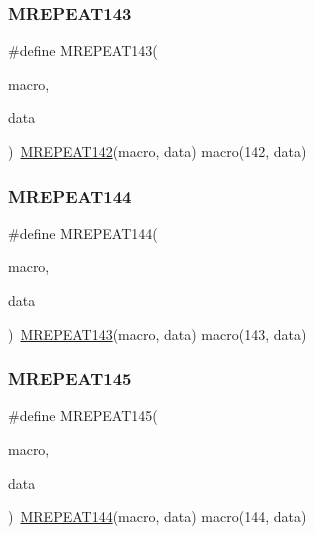\mbox{\label{group__group__sam0__utils__mrepeat_ga6f4bd791a6e9e20406ebf8a1ba70d3e7}} 
\subsubsection{\texorpdfstring{MREPEAT143}{MREPEAT143}}
{\footnotesize\ttfamily \#define M\+R\+E\+P\+E\+A\+T143(\begin{DoxyParamCaption}\item[{}]{macro,  }\item[{}]{data }\end{DoxyParamCaption})~\mbox{\hyperlink{group__group__sam0__utils__mrepeat_ga6177414b6882cdd46b50b679a3cfb927}{M\+R\+E\+P\+E\+A\+T142}}(macro, data)   macro(142, data)}

\mbox{\label{group__group__sam0__utils__mrepeat_ga02a2c148781cd12ab2a14368078ed3ed}} 
\subsubsection{\texorpdfstring{MREPEAT144}{MREPEAT144}}
{\footnotesize\ttfamily \#define M\+R\+E\+P\+E\+A\+T144(\begin{DoxyParamCaption}\item[{}]{macro,  }\item[{}]{data }\end{DoxyParamCaption})~\mbox{\hyperlink{group__group__sam0__utils__mrepeat_ga6f4bd791a6e9e20406ebf8a1ba70d3e7}{M\+R\+E\+P\+E\+A\+T143}}(macro, data)   macro(143, data)}

\mbox{\label{group__group__sam0__utils__mrepeat_gaf589b0dcb9d280437d5f44216096cb09}} 
\subsubsection{\texorpdfstring{MREPEAT145}{MREPEAT145}}
{\footnotesize\ttfamily \#define M\+R\+E\+P\+E\+A\+T145(\begin{DoxyParamCaption}\item[{}]{macro,  }\item[{}]{data }\end{DoxyParamCaption})~\mbox{\hyperlink{group__group__sam0__utils__mrepeat_ga02a2c148781cd12ab2a14368078ed3ed}{M\+R\+E\+P\+E\+A\+T144}}(macro, data)   macro(144, data)}

